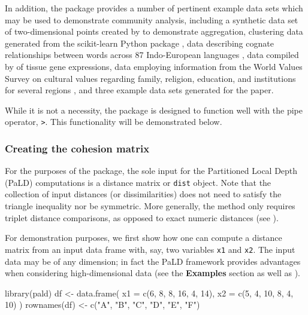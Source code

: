 In addition, the package provides a number of pertinent example data
sets which may be used to demonstrate community analysis, including a
synthetic data set of two-dimensional points created by
\citet{gionis1clustering} to demonstrate aggregation, clustering data
generated from the scikit-learn Python package
\citep{pedregosa2011scikit}, data describing cognate relationships
between words across 87 Indo-European languages \citep{dyen92}, data
compiled by \cite{tissue} of tissue gene expressions, data employing
information from the World Values Survey \citep{inglehart2014world} on
cultural values regarding family, religion, education, and institutions
for several regions \citep{muthukrishna2020beyond}, and three example
data sets generated for the \citet{berenhaut2022social} paper.

While it is not a necessity, the  package is designed to
function well with the pipe operator, \texttt{\textbar{}\textgreater{}}.
This functionality will be demonstrated below.

\hypertarget{creating-the-cohesion-matrix}{%
\subsubsection{Creating the cohesion
matrix}\label{creating-the-cohesion-matrix}}

For the purposes of the  package, the sole input for the
Partitioned Local Depth (PaLD) computations is a distance matrix or
\texttt{dist} object. Note that the collection of input distances (or
dissimilarities) does not need to satisfy the triangle inequality nor be
symmetric. More generally, the method only requires triplet distance
comparisons, as opposed to exact numeric distances (see
\citet{berenhaut2022social}).

For demonstration purposes, we first show how one can compute a distance
matrix from an input data frame with, say, two variables \texttt{x1} and
\texttt{x2}. The input data may be of any dimension; in fact the PaLD
framework provides advantages when considering high-dimensional data
(see the \textbf{Examples} section as well as
\citet{berenhaut2022social}).

\begin{Schunk}
\begin{Sinput}
library(pald)
df <- data.frame(
  x1 = c(6, 8, 8, 16, 4, 14),
  x2 = c(5, 4, 10, 8, 4, 10)
)
rownames(df) <- c("A", "B", "C", "D", "E", "F")
\end{Sinput}
\end{Schunk}

